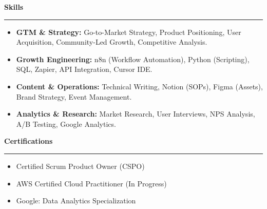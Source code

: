 \documentclass[9pt,letterpaper]{article} %
\newenvironment{rSection}[1]{ %
  \sectionskip
 \textbf{\Large #1} %
  \sectionlineskip
  \hrule %
  \begin{list}{}{ %
    \setlength{\leftmargin}{-0em} %
  }
  \item[]
}{
  \end{list}
}
\def\sectionlineskip{\smallskip} %
\def\sectionskip{} %
\begin{document}
\begin{rSection}{Skills}
\item[] \vspace{-0.5em}
\begin{itemize}[left=-1.5em, labelsep=.1cm, labelwidth=.2cm, itemsep=0.0em]
    \item \textbf{GTM \& Strategy:} Go-to-Market Strategy, Product Positioning, User Acquisition, Community-Led Growth, Competitive Analysis.
    \item \textbf{Growth Engineering:} n8n (Workflow Automation), Python (Scripting), SQL, Zapier, API Integration, Cursor IDE.
    \item \textbf{Content \& Operations:} Technical Writing, Notion (SOPs), Figma (Assets), Brand Strategy, Event Management.
    \item \textbf{Analytics \& Research:} Market Research, User Interviews, NPS Analysis, A/B Testing, Google Analytics.
\end{itemize}
\end{rSection}

\begin{rSection}{Certifications}
\item[] \vspace{-1em}
\begin{itemize}[left=-1.5em, labelsep=.1cm, labelwidth=.2cm, itemsep=0.0em]
\item Certified Scrum Product Owner (CSPO)
\item AWS Certified Cloud Practitioner (In Progress)
\item Google: Data Analytics Specialization
\end{itemize}
\end{rSection}
\end{document}
